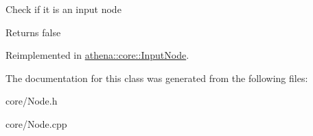 Check if it is an input node \begin{DoxyReturn}{Returns}
false 
\end{DoxyReturn}


Reimplemented in \mbox{\hyperlink{classathena_1_1core_1_1_input_node_a2548b569a336b75c0005295833052979}{athena\+::core\+::\+Input\+Node}}.



The documentation for this class was generated from the following files\+:\begin{DoxyCompactItemize}
\item 
core/Node.\+h\item 
core/Node.\+cpp\end{DoxyCompactItemize}
